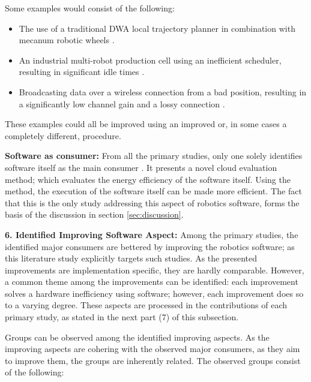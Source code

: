 Some examples would consist of the following:
\begin{itemize}
    \item The use of a traditional DWA local trajectory planner in combination with mecanum robotic wheels \cite{adascalitei2011mecanum_wheels}.
    \item An industrial multi-robot production cell using an inefficient scheduler, resulting in significant idle times \cite{wingstrom2013robot_cell_scheduling}.
    \item Broadcasting data over a wireless connection from a bad position, resulting in a significantly low channel gain and a lossy connection \cite{licea2013wireless_comms}.
\end{itemize}

These examples could all be improved using an improved or, in some cases a completely different, procedure.

\vspace{2mm} \noindent \textbf{Software as consumer:}
From all the primary studies, only one solely identifies software itself as the main consumer \cite{hou2017novel_cloud_evaluation_model}.
It presents a novel cloud evaluation method; which evaluates the energy efficiency of the software itself.
Using the method, the execution of the software itself can be made more efficient. 
The fact that this is the only study addressing this aspect of robotics software, forms the basis of the discussion in section \ref{sec:discussion}.

\vspace{2mm}

\noindent\textbf{6. Identified Improving Software Aspect:}
Among the primary studies, the identified major consumers are bettered by improving the robotics software;
as this literature study explicitly targets such studies.
As the presented improvements are implementation specific, they are hardly comparable.
However, a common theme among the improvements can be identified:
each improvement solves a hardware inefficiency using software; however, each improvement does so to a varying degree. 
These aspects are processed in the contributions of each primary study, 
as stated in the next part (7) of this subsection.

Groups can be observed among the identified improving aspects.
As the improving aspects are cohering with the observed major consumers, as they aim to improve them,
the groups are inherently related.
The observed groups consist of the following:

